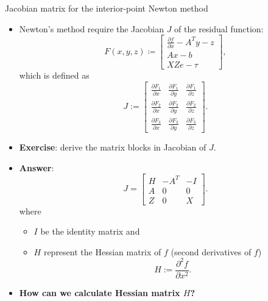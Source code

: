 %
%
\begin{frame}{Jacobian matrix for the interior-point Newton method}
%
\lcol
\begin{itemize}
\item Newton's method require the Jacobian $J$ of the residual function:
\[
F(x,y,z)
\coloneqq\begin{bmatrix}
\frac{\partial f}{\partial x}-A^{T}y-z\\
Ax-b\\
XZe-\tau
\end{bmatrix},
\]
which is defined as  
\[
J :=\begin{bmatrix}
\frac{\partial F_1}{\partial x} & \frac{\partial F_1}{\partial y} & \frac{\partial F_1}{\partial z}\\
\frac{\partial F_2}{\partial x} & \frac{\partial F_2}{\partial y} & \frac{\partial F_2}{\partial z}\\
\frac{\partial F_3}{\partial x} & \frac{\partial F_3}{\partial y} &\frac{\partial F_3}{\partial z}
\end{bmatrix}.
\]
%
\pause
\item \alert{\textbf{Exercise}}: derive the matrix blocks in Jacobian of $J$.
\end{itemize}
\rcol
\hiddenpause
\begin{itemize}
	\item {\bf Answer}:
	\[
	J
	=\begin{bmatrix}
			H & -A^{T} & -I\\
			A & 0 & 0\\
			Z & 0 & X
		\end{bmatrix}.
	\]
where 
\begin{itemize}
	\item $I$ be the identity matrix and
	\item $H$ represent the Hessian matrix of $f$ (second derivatives of $f$)
	\[
	H :=
	\frac{\partial^{2}f}{\partial x^{2}}.
	\]
\end{itemize}
%
\pause
\item \alert{\bf How can we calculate Hessian matrix $H$?}
\end{itemize}

\ecol
\end{frame}
%
